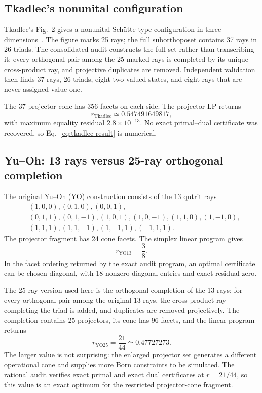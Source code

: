 \documentclass[aps,pra,twocolumn,superscriptaddress,nofootinbib]{revtex4-2}
\newcommand{\YO}{\mathrm{YO}}
\begin{document}
\subsection{Tkadlec's nonunital configuration}

Tkadlec's Fig.~2 gives a nonunital Sch\"utte-type configuration in three
dimensions~\cite{tkadlec-96}.  The figure marks 25 rays; the full
suborthoposet contains 37 rays in 26 triads.  The consolidated audit constructs
the full set rather than transcribing it: every orthogonal pair among the 25
marked rays is completed by its unique cross-product ray, and projective
duplicates are removed.  Independent validation then finds 37 rays, 26 triads,
eight two-valued states, and eight rays that are never assigned value one.

The 37-projector cone has 356 facets on each side.  The projector LP
returns
\begin{equation}
        r_{\mathrm{Tkadlec}}\simeq0.547491649817,
        \label{eq:tkadlec-result}
\end{equation}
with maximum equality residual $2.8\times10^{-13}$.  No exact primal--dual
certificate was recovered, so Eq.~\eqref{eq:tkadlec-result} is numerical.

\subsection{Yu--Oh: 13 rays versus 25-ray orthogonal completion}
\label{subsec:yuoh-comparison}

The original Yu--Oh (YO) construction consists of the 13 qutrit rays
\begin{align}
&(1,0,0),(0,1,0),(0,0,1),\nonumber\\
&(0,1,1),(0,1,-1),(1,0,1),(1,0,-1),(1,1,0),(1,-1,0),\nonumber\\
&(1,1,1),(1,1,-1),(1,-1,1),(-1,1,1).
\end{align}
The projector fragment has 24 cone facets.  The simplex linear program gives
\begin{equation}
        r_{\YO13}=\frac38.
        \label{eq:yo13-result}
\end{equation}
In the facet ordering returned by the exact audit program, an optimal certificate can be chosen diagonal, with 18 nonzero diagonal entries and exact residual zero.

The 25-ray version used here is the orthogonal completion of the 13 rays: for every orthogonal pair among the original 13 rays, the cross-product ray completing the triad is added, and duplicates are removed projectively.  The completion contains 25 projectors, its cone has 96 facets, and the linear program returns
\begin{equation}
        r_{\YO25}=\frac{21}{44}\simeq0.47727273.
        \label{eq:yo25-result}
\end{equation}
The larger value is not surprising: the enlarged projector set generates a different operational cone and supplies more Born constraints to be simulated.  The rational audit verifies exact primal and exact dual certificates at $r=21/44$, so this value is an exact optimum for the restricted projector-cone fragment.
\end{document}
